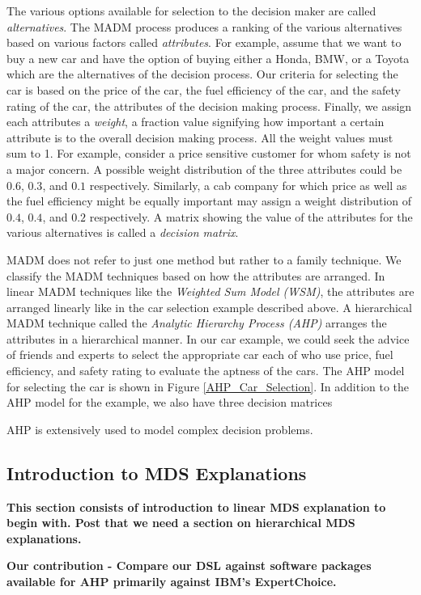 \documentclass{jfp}
\newcommand{\NOTE}[2][gray]{\smallskip\noindent
  \colorbox{#1!30}{\parbox{.98\linewidth}{{\small\textbf{#2}}}}
}
\begin{document}
The various options available for selection to the decision maker are called \emph{alternatives}. The MADM process produces a ranking of the various alternatives based on various factors called \emph{attributes}. For example, assume that we want to buy a new car and have the option of buying either a Honda, BMW, or a Toyota which are the alternatives of the decision process. Our criteria for selecting the car is based on the price of the car, the fuel efficiency of the car, and the safety rating of the car, the attributes of the decision making process. Finally, we assign each attributes a \emph{weight}, a fraction value signifying how important a certain attribute is to the overall decision making process. All the weight values must sum to 1. For example, consider a price sensitive customer for whom safety is not a major concern. A possible weight distribution of the three attributes could be $0.6$, $0.3$, and $0.1$ respectively. Similarly, a cab company for which price as well as the fuel efficiency might be equally important may assign a weight distribution of $0.4$, $0.4$, and $0.2$ respectively. A matrix showing the value of the attributes for the various alternatives is called a \emph{decision matrix}.

MADM does not refer to just one method but rather to a family technique. We classify the MADM techniques based on how the attributes are arranged. In linear MADM techniques like the \emph{Weighted Sum Model (WSM)}, the attributes are arranged linearly like in the car selection example described above. A hierarchical MADM technique called the \emph{Analytic Hierarchy Process (AHP)} arranges the attributes in a hierarchical manner. In our car example, we could seek the advice of friends and experts to select the appropriate car each of who use price, fuel efficiency, and safety rating to evaluate the aptness of the cars. The AHP model for selecting the car is shown in Figure \ref{AHP_Car_Selection}. In addition to the AHP model for the example, we also have three decision matrices

AHP is extensively used to model complex decision problems. 

\subsection{Introduction to MDS Explanations}
\NOTE{This section consists of introduction to linear MDS explanation to begin with. Post that we need a section on hierarchical MDS explanations.}

\NOTE{Our contribution - Compare our DSL against software packages available for AHP primarily against IBM's ExpertChoice.}
\end{document}

